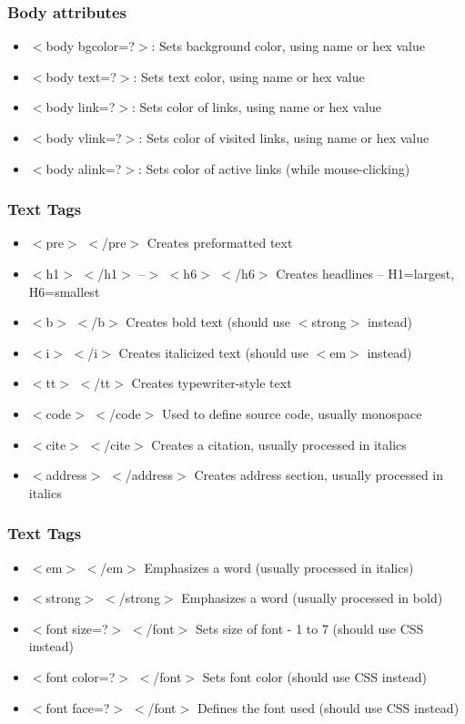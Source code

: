 \documentclass{beamer}
\begin{document}
\begin{frame}
\frametitle{Body attributes}
\begin{itemize}
 \item  $<$body bgcolor=?$>$: Sets background color, using name or hex value
\item  $<$body text=?$>$:  Sets text color, using name or hex value
\item  $<$body link=?$>$:  Sets color of links, using name or hex value
\item  $<$body vlink=?$>$:  Sets color of visited links, using name or hex value
\item  $<$body alink=?$>$: Sets color of active links (while mouse-clicking)
\end{itemize}
\end{frame}
\begin{frame}
\frametitle{ Text Tags}
\begin{itemize}
 \item  $<$pre$>$ $<$/pre$>$
 Creates preformatted text
 \item  $<$h1$>$ $<$/h1$>$ --$>$ $<$h6$>$ $<$/h6$>$
 Creates headlines -- H1=largest, H6=smallest
 \item  $<$b$>$ $<$/b$>$
 Creates bold text (should use $<$strong$>$ instead)
 \item  $<$i$>$ $<$/i$>$
 Creates italicized text (should use $<$em$>$ instead)
 \item  $<$tt$>$ $<$/tt$>$
 Creates typewriter-style text
\item   $<$code$>$ $<$/code$>$
 Used to define source code, usually monospace
 \item  $<$cite$>$ $<$/cite$>$
 Creates a citation, usually processed in italics
 \item  $<$address$>$ $<$/address$>$
 Creates address section, usually processed in italics
 \end{itemize}
\end{frame}
\begin{frame}
\frametitle{ Text Tags}
\begin{itemize}
  \item  $<$em$>$ $<$/em$>$
 Emphasizes a word (usually processed in italics)
 \item  $<$strong$>$ $<$/strong$>$
 Emphasizes a word (usually processed in bold)
 \item  $<$font size=?$>$ $<$/font$>$    
Sets size of font - 1 to 7 (should use CSS instead)
 \item  $<$font color=?$>$ $<$/font$>$
 Sets font color (should use CSS instead)
 \item  $<$font face=?$>$ $<$/font$>$
 Defines the font used (should use CSS instead)
\end{itemize}
\end{frame}
\end{document}
